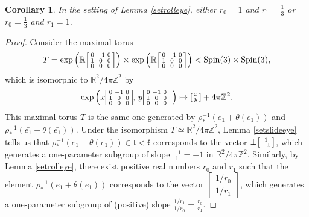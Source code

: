 \documentclass[12pt,a4paper]{amsart}
\newtheorem{corollary}[theorem]{Corollary}
\theoremstyle{definition}
\DeclareMathOperator{\Spin}{Spin}
\newenvironment{smallbmatrix}
  {\left[\begin{smallmatrix}}
  {\end{smallmatrix}\right]}
\begin{document}
\begin{corollary}\label{ratioappears} In the setting of Lemma \ref{setrolleye}, either $r_0=1$ and $r_1=\tfrac{1}{3}$ or $r_0=\tfrac{1}{3}$ and $r_1=1$.\end{corollary}
\begin{proof}Consider the maximal torus
\[T=\exp\left(\mathbb{R}\begin{smallbmatrix}0 & -1 & 0 \\ 1 & 0 & 0 \\ 0 & 0 & 0\end{smallbmatrix}\right)\times\exp\left(\mathbb{R}\begin{smallbmatrix}0 & -1 & 0 \\ 1 & 0 & 0 \\ 0 & 0 & 0\end{smallbmatrix}\right)<\Spin(3)\times\Spin(3),\]
which is isomorphic to $\mathbb{R}^2/4\pi\mathbb{Z}^2$ by
\[\exp\left(x\!\begin{smallbmatrix}0 & -1 & 0 \\ 1 & 0 & 0 \\ 0 & 0 & 0\end{smallbmatrix}\!,\, y\!\begin{smallbmatrix}0 & -1 & 0 \\ 1 & 0 & 0 \\ 0 & 0 & 0\end{smallbmatrix}\right)\mapsto\begin{smallbmatrix}x \\ y\end{smallbmatrix}+4\pi\mathbb{Z}^2.\]
This maximal torus $T$ is the same one generated by $\rho_*^{-1}(e_1+\theta(e_1))$ and $\rho_*^{-1}(\bar{e_1}+\theta(\bar{e_1}))$. Under the isomorphism $T\simeq\mathbb{R}^2/4\pi\mathbb{Z}^2$, Lemma \ref{setslideeye} tells us that $\rho_*^{-1}(\bar{e_1}+\theta(\bar{e_1}))\in\mathfrak{t}<\mathfrak{k}$ corresponds to the vector $\pm\begin{smallbmatrix}1 \\ -1\end{smallbmatrix}$, which generates a one-parameter subgroup of slope $\frac{-1}{1}=-1$ in $\mathbb{R}^2/4\pi\mathbb{Z}^2$. Similarly, by Lemma \ref{setrolleye}, there exist positive real numbers $r_0$ and $r_1$ such that the element $\rho_*^{-1}(e_1+\theta(e_1))$ corresponds to the vector $[\begin{smallmatrix}1/r_0 \\ 1/r_1\end{smallmatrix}]$, which generates a one-parameter subgroup of (positive) slope $\tfrac{1/r_1}{1/r_0}=\tfrac{r_0}{r_1}$.


\end{proof}
\end{document}
